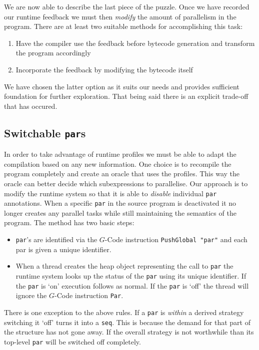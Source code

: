 We are now able to describe the last piece of the puzzle. Once we have
recorded our runtime feedback we must then \emph{modify} the amount of
parallelism in the program. There are at least two suitable methods for
accomplishing this task:

    \begin{enumerate}
        \item Have the compiler use the feedback before bytecode generation
            and transform the program accordingly
        \item Incorporate the feedback by modifying the bytecode itself
    \end{enumerate}

We have chosen the latter option as it suits our needs and provides sufficient
foundation for further exploration. That being said there is an explicit
trade-off that has occured.

\subsection{Switchable \texttt{par}s}
\label{sec:switchPar}

    In order to take advantage of runtime profiles we must be able to adapt the
compilation based on any new information.  One choice is to recompile the
program completely and create an oracle that uses the profiles. This way the
oracle can better decide which subexpressions to parallelise. Our approach is to
modify the runtime system so that it is able to \emph{disable} individual
\verb-par- annotations. When a specific \verb=par= in the source program is
deactivated it no longer creates any parallel tasks while still maintaining the
semantics of the program.  The method has two basic steps:

    \begin{itemize}
        \item \verb=par='s are identified via the $G$-Code instruction
                \verb=PushGlobal "par"= and each par is given a unique identifier.
        \item When a thread creates the heap object representing the call to
                \verb=par= the runtime system looks up the status of the \verb=par= using its
                unique identifier. If the \verb=par= is `on' execution follows as normal. If the
                \verb=par= is `off' the thread will ignore the $G$-Code instruction \verb=Par=.
    \end{itemize}

There is one exception to the above rules. If a \verb|par| is \emph{within} a
derived strategy switching it `off' turns it into a \verb|seq|. This is because
the demand for that part of the structure has not gone away. If the overall
strategy is not worthwhile than its top-level \verb|par| will be switched off
completely.
